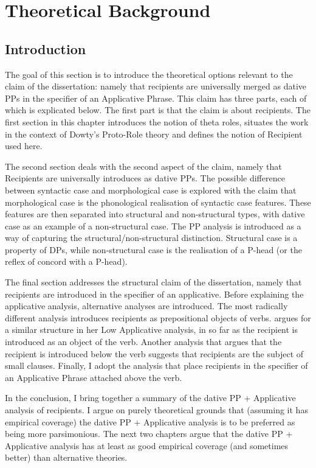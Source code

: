 \chapter{Theoretical Background}
\label{ch:theoryback}
\section{Introduction}
The goal of this section is to introduce the theoretical options relevant to the claim of the dissertation: namely that recipients are universally merged as dative PPs in the specifier of an Applicative Phrase. This claim has three parts, each of which is explicated below. The first part is that the claim is about recipients. The first section in this chapter introduces the notion of theta roles, situates the work in the context of Dowty's Proto-Role theory and defines the notion of Recipient used here.

The second section deals with the second aspect of the claim, namely that Recipients are universally introduces as dative PPs. The possible difference between syntactic case and morphological case is explored with the claim that morphological case is the phonological realisation of syntactic case features. These features are then separated into structural and non-structural types, with dative case as an example of a non-structural case. The PP analysis is introduced as a way of capturing the structural/non-structural distinction. Structural case is a property of DPs, while non-structural case is the realisation of a P-head (or the reflex of concord with a P-head).

The final section addresses the structural claim of the dissertation, namely that recipients are introduced in the specifier of an applicative. Before explaining the applicative analysis, alternative analyses are introduced. The most radically different analysis introduces recipients as prepositional objects of verbs. \cite{Pylkkanen.2001} argues for a similar structure in her Low Applicative analysis, in so far as the recipient is introduced as an object of the verb. Another analysis that argues that the recipient is introduced below the verb suggests that recipients are the subject of small clauses. Finally, I adopt the analysis that place recipients in the specifier of an Applicative Phrase attached above the verb.

In the conclusion, I bring together a summary of the dative PP + Applicative analysis of recipients. I argue on purely theoretical grounds that (assuming it has empirical coverage) the dative PP + Applicative analysis is to be preferred as being more parsimonious. The next two chapters argue that the dative PP + Applicative analysis has at least as good empirical coverage (and sometimes better) than alternative theories.

